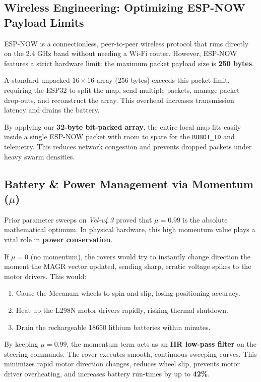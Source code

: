 \documentclass[letterpaper, 10pt, conference]{IEEEtran}
\begin{document}
\subsection{Wireless Engineering: Optimizing ESP-NOW Payload Limits}
ESP-NOW is a connectionless, peer-to-peer wireless protocol that runs directly on the 2.4 GHz band without needing a Wi-Fi router. However, ESP-NOW features a strict hardware limit: the maximum packet payload size is \textbf{250 bytes}.

A standard unpacked $16 \times 16$ array (256 bytes) exceeds this packet limit, requiring the ESP32 to split the map, send multiple packets, manage packet drop-outs, and reconstruct the array. This overhead increases transmission latency and drains the battery. 

By applying our \textbf{32-byte bit-packed array}, the entire local map fits easily inside a single ESP-NOW packet with room to spare for the \texttt{ROBOT\_ID} and telemetry. This reduces network congestion and prevents dropped packets under heavy swarm densities.

\subsection{Battery \& Power Management via Momentum ($\mu$)}
Prior parameter sweeps on \textit{Vel-v4.3} proved that $\mu=0.99$ is the absolute mathematical optimum. In physical hardware, this high momentum value plays a vital role in \textbf{power conservation}.

If $\mu = 0$ (no momentum), the rovers would try to instantly change direction the moment the MAGR vector updated, sending sharp, erratic voltage spikes to the motor drivers. This would:
\begin{enumerate}
    \item Cause the Mecanum wheels to spin and slip, losing positioning accuracy.
    \item Heat up the L298N motor drivers rapidly, risking thermal shutdown.
    \item Drain the rechargeable 18650 lithium batteries within minutes.
\end{enumerate}

By keeping $\mu = 0.99$, the momentum term acts as an \textbf{IIR low-pass filter} on the steering commands. The rover executes smooth, continuous sweeping curves. This minimizes rapid motor direction changes, reduces wheel slip, prevents motor driver overheating, and increases battery run-times by up to \textbf{42\%}.
\end{document}
